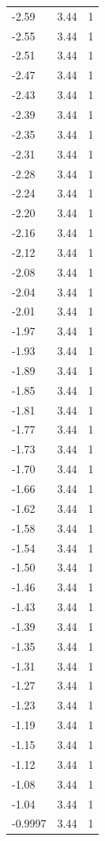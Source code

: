 \begin{longtable}{lrr}
  -2.59 & 3.44 & 1 \\
  -2.55 & 3.44 & 1 \\
  -2.51 & 3.44 & 1 \\
  -2.47 & 3.44 & 1 \\
  -2.43 & 3.44 & 1 \\
  -2.39 & 3.44 & 1 \\
  -2.35 & 3.44 & 1 \\
  -2.31 & 3.44 & 1 \\
  -2.28 & 3.44 & 1 \\
  -2.24 & 3.44 & 1 \\
  -2.20 & 3.44 & 1 \\
  -2.16 & 3.44 & 1 \\
  -2.12 & 3.44 & 1 \\
  -2.08 & 3.44 & 1 \\
  -2.04 & 3.44 & 1 \\
  -2.01 & 3.44 & 1 \\
  -1.97 & 3.44 & 1 \\
  -1.93 & 3.44 & 1 \\
  -1.89 & 3.44 & 1 \\
  -1.85 & 3.44 & 1 \\
  -1.81 & 3.44 & 1 \\
  -1.77 & 3.44 & 1 \\
  -1.73 & 3.44 & 1 \\
  -1.70 & 3.44 & 1 \\
  -1.66 & 3.44 & 1 \\
  -1.62 & 3.44 & 1 \\
  -1.58 & 3.44 & 1 \\
  -1.54 & 3.44 & 1 \\
  -1.50 & 3.44 & 1 \\
  -1.46 & 3.44 & 1 \\
  -1.43 & 3.44 & 1 \\
  -1.39 & 3.44 & 1 \\
  -1.35 & 3.44 & 1 \\
  -1.31 & 3.44 & 1 \\
  -1.27 & 3.44 & 1 \\
  -1.23 & 3.44 & 1 \\
  -1.19 & 3.44 & 1 \\
  -1.15 & 3.44 & 1 \\
  -1.12 & 3.44 & 1 \\
  -1.08 & 3.44 & 1 \\
  -1.04 & 3.44 & 1 \\
  -0.9997 & 3.44 & 1 \\

\end{longtable}
